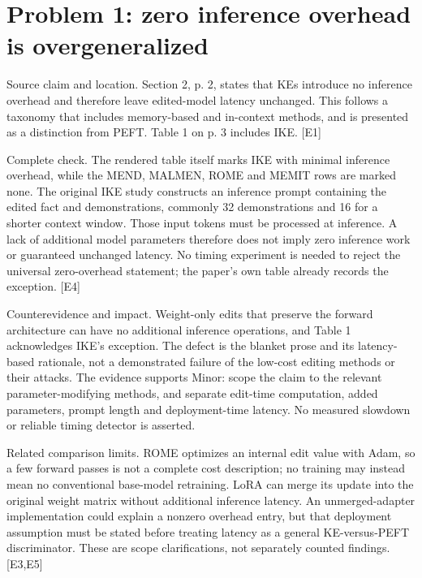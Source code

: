 \documentclass[10pt]{article}
\begin{document}
\section*{Problem 1: zero inference overhead is overgeneralized}
Source claim and location. Section 2, p. 2, states that KEs introduce no inference overhead and therefore leave edited-model latency unchanged. This follows a taxonomy that includes memory-based and in-context methods, and is presented as a distinction from PEFT. Table 1 on p. 3 includes IKE. [E1]\par
Complete check. The rendered table itself marks IKE with minimal inference overhead, while the MEND, MALMEN, ROME and MEMIT rows are marked none. The original IKE study constructs an inference prompt containing the edited fact and demonstrations, commonly 32 demonstrations and 16 for a shorter context window. Those input tokens must be processed at inference. A lack of additional model parameters therefore does not imply zero inference work or guaranteed unchanged latency. No timing experiment is needed to reject the universal zero-overhead statement; the paper’s own table already records the exception. [E4]\par
Counterevidence and impact. Weight-only edits that preserve the forward architecture can have no additional inference operations, and Table 1 acknowledges IKE’s exception. The defect is the blanket prose and its latency-based rationale, not a demonstrated failure of the low-cost editing methods or their attacks. The evidence supports Minor: scope the claim to the relevant parameter-modifying methods, and separate edit-time computation, added parameters, prompt length and deployment-time latency. No measured slowdown or reliable timing detector is asserted.\par
Related comparison limits. ROME optimizes an internal edit value with Adam, so a few forward passes is not a complete cost description; no training may instead mean no conventional base-model retraining. LoRA can merge its update into the original weight matrix without additional inference latency. An unmerged-adapter implementation could explain a nonzero overhead entry, but that deployment assumption must be stated before treating latency as a general KE-versus-PEFT discriminator. These are scope clarifications, not separately counted findings. [E3,E5]\par
\end{document}
